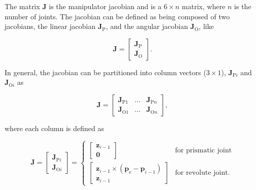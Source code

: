 The matrix $\boldsymbol{J}$ is the manipulator jacobian and is a $6 \times n$ matrix, where $n$ is the number of joints. The jacobian can be defined as being composed of two jacobians, the linear jacobian $\boldsymbol{J}_\text{P}$, and the angular jacobian $\boldsymbol{J}_\text{O}$, like

\begin{equation}
    \boldsymbol{J} = \begin{bmatrix}
    \boldsymbol{J}_\text{P}\\
    \boldsymbol{J}_\text{O}
    \end{bmatrix}.
\end{equation}

In general, the jacobian can be partitioned into column vectors ($3\times1$), $\boldsymbol{J}_{\text{P}i}$ and $\boldsymbol{J}_{\text{O}i}$ as

\begin{equation}
    \boldsymbol{J} = \begin{bmatrix}
    \boldsymbol{J}_{\text{P}1} & \ldots & \boldsymbol{J}_{\text{P}n} \\
    \boldsymbol{J}_{\text{O}1} & \ldots & \boldsymbol{J}_{\text{O}n}
    \end{bmatrix},
\end{equation}

where each column is defined as

\begin{equation}
    \label{eq:jacobian_column}
    \boldsymbol{J} = \begin{bmatrix}
    \boldsymbol{J}_{\text{P}i}\\
    \boldsymbol{J}_{\text{O}i}
    \end{bmatrix} = \left\{ \begin{array}{cc}
        \begin{bmatrix}
            \boldsymbol{z}_{i-1}\\
            \boldsymbol{0}
        \end{bmatrix} & \text{for prismatic joint} \\
        \begin{bmatrix}
        \boldsymbol{z}_{i-1} \times (\boldsymbol{p}_\text{e} - \boldsymbol{p}_{i-1})\\
        \boldsymbol{z}_{i-1}
        \end{bmatrix} & \text{for revolute joint}.
    \end{array}\right.
\end{equation}

